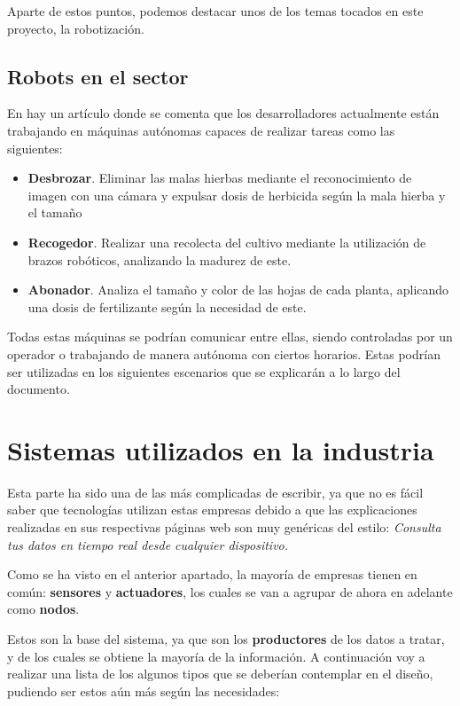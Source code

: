 Aparte de estos puntos, podemos destacar unos de los temas tocados en este proyecto, la robotización.

\subsection{Robots en el sector}


En \cite{revista-agraria} hay un artículo donde se comenta que los desarrolladores actualmente están trabajando en máquinas autónomas capaces de realizar tareas como las siguientes:

\begin{itemize}
    \item \textbf{Desbrozar}. Eliminar las malas hierbas mediante el reconocimiento de imagen con una cámara y expulsar dosis de herbicida según la mala hierba y el tamaño
    \item \textbf{Recogedor}. Realizar una recolecta del cultivo mediante la utilización de brazos robóticos, analizando la madurez de este.
    \item \textbf{Abonador}. Analiza el tamaño y color de las hojas de cada planta, aplicando una dosis de fertilizante según la necesidad de este.
\end{itemize}

Todas estas máquinas se podrían comunicar entre ellas, siendo controladas por un operador o trabajando de manera autónoma con ciertos horarios. Estas podrían ser utilizadas en los siguientes escenarios que se explicarán a lo largo del documento.

\section{Sistemas utilizados en la industria}

Esta parte ha sido una de las más complicadas de escribir, ya que no es fácil saber que tecnologías utilizan estas empresas debido a que las explicaciones realizadas en sus respectivas páginas web son muy genéricas del estilo: \textit{Consulta tus datos en tiempo real desde cualquier dispositivo.}

Como se ha visto en el anterior apartado, la mayoría de empresas tienen en común: \textbf{sensores} y \textbf{actuadores}, los cuales se van a agrupar de ahora en adelante como \textbf{nodos}.

Estos son la base del sistema, ya que son los \textbf{productores} de los datos a tratar, y de los cuales se obtiene la mayoría de la información. A continuación voy a realizar una lista de los algunos tipos que se deberían contemplar en el diseño, pudiendo ser estos aún más según las necesidades:

